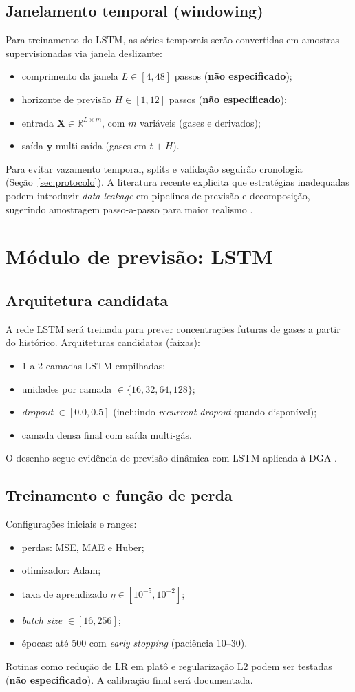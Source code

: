 \subsection{Janelamento temporal (windowing)}
Para treinamento do LSTM, as séries temporais serão convertidas em
amostras supervisionadas via janela deslizante:
\begin{itemize}
\item comprimento da janela $L \in [4,48]$ passos (\textbf{não
especificado});
\item horizonte de previsão $H \in [1,12]$ passos (\textbf{não
especificado});
\item entrada $\mathbf{X}\in\mathbb{R}^{L\times m}$, com $m$
variáveis (gases e derivados);
\item saída $\mathbf{y}$ multi-saída (gases em $t+H$).
\end{itemize}
Para evitar vazamento temporal, splits e validação seguirão
cronologia (Seção~\ref{sec:protocolo}).
A literatura recente explicita que estratégias inadequadas podem
introduzir \textit{data leakage} em pipelines de previsão e decomposição, sugerindo amostragem passo-a-passo para maior realismo
\cite{chen2024_sds_vmd_lstm_dga}.

\section{Módulo de previsão: LSTM}
\subsection{Arquitetura candidata}
A rede LSTM será treinada para prever concentrações futuras de gases
a partir do histórico.
Arquiteturas candidatas (faixas):
\begin{itemize}
\item 1 a 2 camadas LSTM empilhadas;
\item unidades por camada $\in\{16,32,64,128\}$;
\item \textit{dropout} $\in[0.0,0.5]$ (incluindo \textit{recurrent
dropout} quando disponível);
\item camada densa final com saída multi-gás.
\end{itemize}
O desenho segue evidência de previsão dinâmica com LSTM aplicada à
DGA \cite{wang2023_lstm_dga}.

\subsection{Treinamento e função de perda}
Configurações iniciais e ranges:
\begin{itemize}
\item perdas: MSE, MAE e Huber;
\item otimizador: Adam;
\item taxa de aprendizado $\eta \in [10^{-5},10^{-2}]$;
\item \textit{batch size} $\in[16,256]$;
\item \'{e}pocas: até 500 com \textit{early stopping} (paciência
10--30).
\end{itemize}
Rotinas como redução de LR em platô e regularização L2 podem
ser testadas (\textbf{não especificado}).
A calibração final será documentada.

